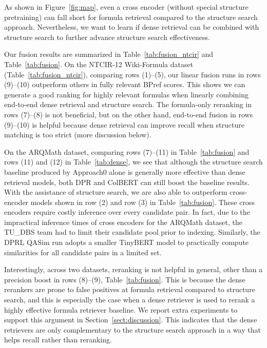 \documentclass[11pt]{article}
\begin{document}
As shown in Figure~\ref{fig:map}, even a cross encoder (without special structure pretraining) can fall short for formula retrieval compared to the structure search approach.
Nevertheless, we want to learn if dense retrieval can be combined with structure search to further advance structure search effectiveness.

Our fusion results are summarized in Table~\ref{tab:fusion_ntcir} and  Table~\ref{tab:fusion}.
On the NTCIR-12 Wiki-Formula dataset (Table~\ref{tab:fusion_ntcir}),
comparing rows (1)--(5),
our linear fusion runs in rows (9)--(10) outperform others in fully relevant BPref scores.
This shows we can generate a good ranking for highly relevant formulas when linearly combining end-to-end dense retrieval and structure search.
The formula-only reranking in rows (7)--(8) is not beneficial,
but on the other hand, end-to-end fusion in rows (9)--(10) is helpful because dense retrieval can improve recall when structure matching is too strict (more discussion below).

On the ARQMath dataset,
comparing rows (7)--(11) in Table~\ref{tab:fusion} and rows (11) and (12) in Table~\ref{tab:dense}, we see that although the structure search baseline produced by Approach0 alone is generally more effective than dense retrieval models, both DPR and ColBERT can still boost the baseline results.
With the assistance of structure search, we are also able to outperform cross-encoder models shown in row (2) and row (3) in Table~\ref{tab:fusion}.
These cross encoders require costly inference over every candidate pair.
In fact, due to the impractical inference times of cross encoders for the ARQMath dataset, the TU\_DBS team had to limit their candidate pool prior to indexing.
Similarly, the DPRL QASim run adopts a smaller TinyBERT model to practically compute similarities for all candidate pairs in a limited set.


Interestingly, across two datasets, reranking is not helpful in general, other than a precision boost in rows (8)--(9), Table~\ref{tab:fusion}.
This is because the dense rerankers are prone to false positives at formula retrieval compared to structure search, and this is especially the case when a dense retriever is used to rerank a highly effective formula retriever baseline.
We report extra experiments to support this argument in Section~\ref{sect:discussion}.
This indicates that the dense retrievers are only complementary to the structure search approach in a way that helps recall rather than reranking.
\end{document}
